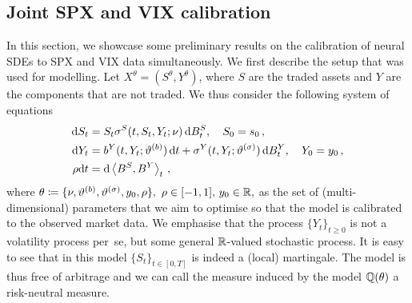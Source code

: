 \subsection{Joint SPX and VIX calibration}
In this section, we showcase some preliminary results on the calibration of neural SDEs to SPX and VIX data simultaneously. We first describe the setup that was used for modelling. Let $X^\theta=(S^\theta, Y^\theta)$, where $S$ are the traded assets and $Y$ are the components that are not traded. We thus consider the following system of equations
\begin{equation}\label{eq:nsdeSY}
\begin{split}
\mathrm{d} S_t & = S_t \sigma^S(t, S_t, Y_t;\nu)\,\mathrm{d} B^S_t, \quad S_0 = s_0 \,,\\
\mathrm{d} Y_t & = b^Y(t, Y_t; \vartheta^{(b)}) \, \mathrm{d} t +  \sigma^Y(t, Y_t; \vartheta^{(\sigma)})\,\mathrm{d} B^Y_t, \quad Y_0 = y_0\,,\\
\rho \mathrm{d} t &= \mathrm{d} \left\langle B^S, B^ Y\right\rangle_t \,,
\end{split}
\end{equation}
where
$\theta \coloneqq  \{\nu, \vartheta^{(b)}, \vartheta^{(\sigma)}, y_0, \rho \},\,\,\rho\in[-1,1],\,y_0\in\mathbb{R}, 
$
as the set of (multi-dimensional) parameters that we aim to optimise so that 
the model is calibrated to the observed market data. We emphasise that the process $\{Y_t\}_{t\geq 0}$ is not a volatility process per~se, but some general $\mathbb{R}$-valued stochastic process. It is easy to see that in this model $\{S_t\}_{t\in[0,T]}$ is indeed a (local) martingale. The model is thus free of arbitrage and we can call the measure induced by the model $\mathbb{Q}(\theta)$ a risk-neutral measure.

